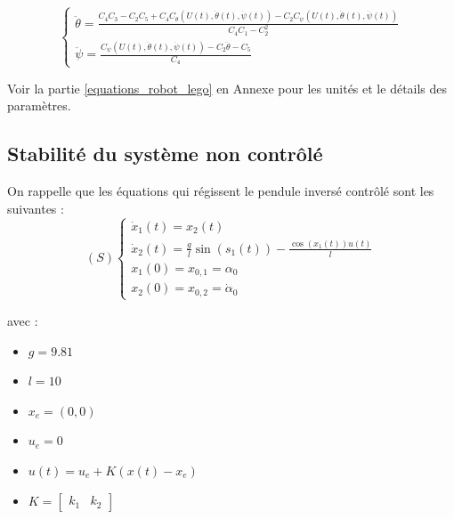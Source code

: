 \documentclass[a4paper]{article}
\begin{document}
                                $$
                                \begin{cases}
                                        \ddot \theta = \frac{C_4 C_3 - C_2 C_5 + C_4 C_{\theta} (U(t), \dot \theta (t), \dot \psi (t)) - C_2 C_{\psi} (U(t), \dot \theta (t), \dot \psi (t))}{C_4 C_1 - C_2^2} \\
                                        \ddot \psi = \frac{C_{\psi} (U(t), \dot \theta (t), \dot \psi (t)) - C_2 \ddot \theta - C_5}{C_4}
                                \end{cases}
                                $$

                                Voir la partie \ref{equations_robot_lego} en Annexe pour les unités et le détails des paramètres. \\


                \subsection{Stabilité du système non contrôlé}

                        On rappelle que les équations qui régissent le pendule inversé contrôlé sont les suivantes :
                        $$
                        (S)
                        \begin{cases}
                            \dot x_1(t) = x_2(t) \\
                            \dot x_2(t) = \frac{g}{l} \sin (s_1(t)) - \frac{\cos (x_1(t))u(t)}{l} \\
                            x_1(0) = x_{0,1} = \alpha _0 \\
                            x_2(0) = x_{0,2} = \dot \alpha _0
                        \end{cases}
                        $$

                        avec :

                        \begin{itemize}
                                \item $g=9.81$
                                \item $l=10$
                                \item $x_e=(0,0)$
                                \item $u_e = 0$
                                \item $u(t) = u_e + K(x(t) - x_e)$
                                \item $K = \begin{bmatrix} k_1 & k_2 \end{bmatrix}$
                        \end{itemize}
\end{document}
